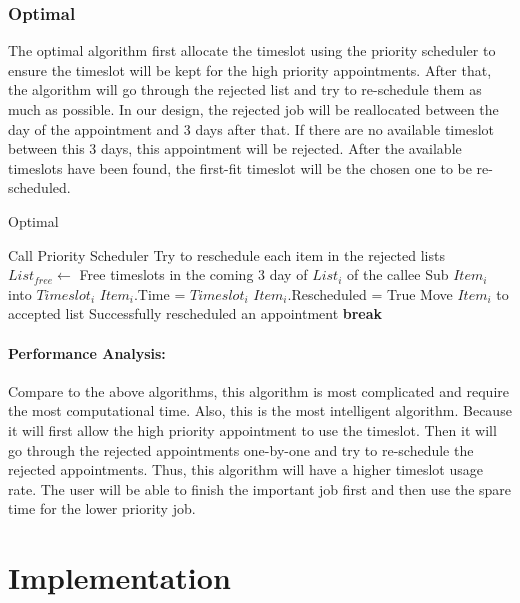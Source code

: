 \documentclass[12pt,a4paper]{report}
\newcommand{\In}{\textbf{in}\,}
\begin{document}
\subsection{Optimal}
The optimal algorithm first allocate the timeslot using the priority scheduler to ensure the timeslot will be kept for the high priority appointments. After that, the algorithm will go through the rejected list and try to re-schedule them as much as possible. In our design, the rejected job will be reallocated between the day of the appointment and 3 days after that. If there are no available timeslot between this 3 days, this appointment will be rejected. After the available timeslots have been found, the first-fit timeslot will be the chosen one to be re-scheduled.
\begin{algorithm}
\caption{Optimal}\label{Psudo:Opti}
\begin{algorithmic}
\State Call Priority Scheduler
\LineComment Try to reschedule each item in the rejected lists
  \State $List_{free} \gets$ Free timeslots in the coming 3 day of $List_i$ of the callee
  \For {\textbf{each} $Timeslot_i$ \In $List_{free}$}
    \State Sub $Item_i$ into $Timeslot_i$
      \State $Item_i$.Time = $Timeslot_i$
      \State $Item_i$.Rescheduled = True
      \State Move $Item_i$ to accepted list \Comment Successfully rescheduled an appointment
      \State \textbf{break}
    \EndIf
  \EndFor
\EndFor
\end{algorithmic}
\end{algorithm}
\subsubsection{Performance Analysis:}
Compare to the above algorithms, this algorithm is most complicated and require the most computational time. Also, this is the most intelligent algorithm. Because it will first allow the high priority appointment to use the timeslot. Then it will go through the rejected appointments one-by-one and try to re-schedule the rejected appointments. Thus, this algorithm will have a higher timeslot usage rate. The user will be able to finish the important job first and then use the spare time for the lower priority job.
\chapter{Implementation}
\end{document}

